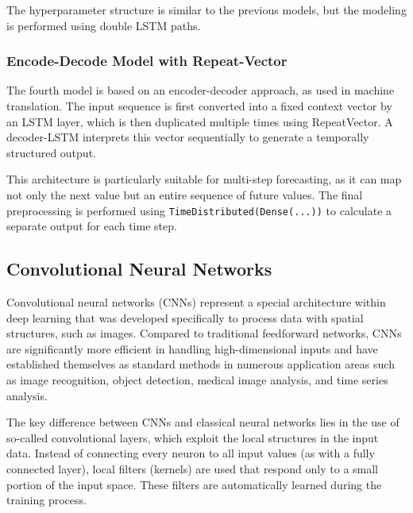 The hyperparameter structure is similar to the previous models, but the modeling is performed using double LSTM paths.



\subsubsection{Encode-Decode Model with Repeat-Vector}

The fourth model is based on an encoder-decoder approach, as used in machine translation. The input sequence is first converted into a fixed context vector by an LSTM layer, which is then duplicated multiple times using RepeatVector. A decoder-LSTM interprets this vector sequentially to generate a temporally structured output.

This architecture is particularly suitable for multi-step forecasting, as it can map not only the next value but an entire sequence of future values. The final preprocessing is performed using \verb|TimeDistributed(Dense(...))| to calculate a separate output for each time step.



\subsection{Convolutional Neural Networks}

Convolutional neural networks (CNNs) represent a special architecture within deep learning that was developed specifically to process data with spatial structures, such as images. Compared to traditional feedforward networks, CNNs are significantly more efficient in handling high-dimensional inputs and have established themselves as standard methods in numerous application areas such as image recognition, object detection, medical image analysis, and time series analysis.

The key difference between CNNs and classical neural networks lies in the use of so-called convolutional layers, which exploit the local structures in the input data. Instead of connecting every neuron to all input values (as with a fully connected layer), local filters (kernels) are used that respond only to a small portion of the input space. These filters are automatically learned during the training process.

